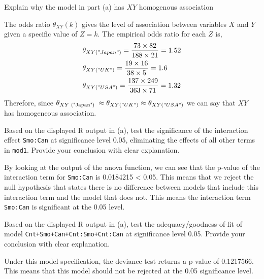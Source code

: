 \documentclass[nocolor]{report}
\begin{document}
\begin{ex}[Question 2b] 
    Explain why
the model in part (a) has $XY$ homogenous association
\end{ex}
\vspace{-10pt}
\begin{soln}
    The odds ratio $\theta_{X Y}(k)$ gives the level of association between variables $X$ and $Y$ given a specific value of $Z=k$. The empirical odds ratio for each $Z$ is,
    \begin{align*}
        & \theta_{X Y(" J a p a n ")}=\frac{73 \times 82}{188 \times 21}=1.52 \\
        & \theta_{X Y(" U K ")}=\frac{19 \times 16}{38 \times 5}=1.6 \\
        & \theta_{X Y(" U S A ")}=\frac{137 \times 249}{363 \times 71}=1.32
    \end{align*}
Therefore, since $\theta_{X Y \text { ("Japan") }} \approx \theta_{X Y(" U K ")} \approx \theta_{X Y(" U S A ")}$ we can say that $X Y$ has homogeneous association.
\end{soln}

\begin{ex}[Question 2c] 
    Based on the displayed R output in (a), test the significance of the interaction effect \texttt{Smo:Can} at significance level 0.05, eliminating the effects of all other terms in \texttt{mod1}. Provide your conclusion with clear explanation.
\end{ex}
\vspace{-10pt}
\begin{soln}
    By looking at the output of the anova function, we can see that the p-value of the interaction term for \texttt{Smo:Can} is 0.0184215 < 0.05. This means that we reject the null hypothesis that states there is
no difference between models that include this interaction term and the model that does not. This means the interaction term \texttt{Smo:Can} is significant at the 0.05 level.
\end{soln}


\begin{ex}[Question 2d] 
    Based on the displayed R output in (a), test the adequacy/goodness-of-fit of model
    \texttt{Cnt+Smo+Can+Cnt:Smo+Cnt:Can}
at significance level 0.05. Provide your conclusion with clear explanation.
\end{ex}
\vspace{-10pt}
\begin{soln}
    Under this model specification, the deviance test returns a p-value of 0.1217566. This means that
this model should not be rejected at the 0.05 significance level.
\end{soln}
\end{document}
